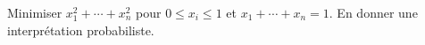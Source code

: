 Minimiser $x_1^2 + \cdots + x_n^2$ pour $0 \leq x_i \leq 1$ et $x_1 + \cdots + x_n = 1$. En donner une interprétation probabiliste.
